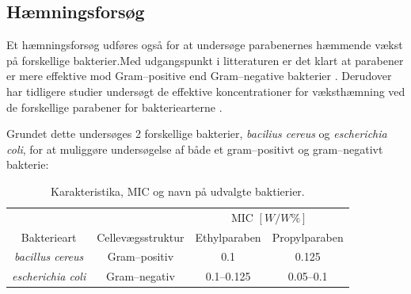     \subsection{Hæmningsforsøg}
    Et hæmningsforsøg udføres også for at undersøge parabenernes hæmmende vækst på forskellige bakterier.Med udgangspunkt i litteraturen er det klart at parabener er mere effektive mod Gram--positive end Gram--negative bakterier \parencite{Joao2021}. Derudover har tidligere studier undersøgt de effektive koncentrationer for væksthæmning ved de forskellige parabener for bakteriearterne \parencite{Wies2019}. 

    Grundet dette undersøges 2 forskellige bakterier, \textit{bacilius cereus} og \textit{escherichia coli}, for at muliggøre undersøgelse af både et gram--positivt og gram--negativt bakterie:
    \begin{table}[H]\centering
        \caption{Karakteristika, MIC og navn på udvalgte baktierier.}
        \begin{tabular}{cccc}
            \toprule
            & & \multicolumn{2}{c}{MIC $\left[\si{W\per W\%}\right]$} \\
            \cmidrule(r){3-4}
            Bakterieart & Cellevægsstruktur & Ethylparaben & Propylparaben \\
            \midrule
            \textit{bacillus cereus} & Gram--positiv & 0.1 & 0.125 \\
            \textit{escherichia coli} & Gram--negativ & 0.1--0.125 & 0.05--0.1 \\
            \bottomrule
        \end{tabular}
    \end{table}
    
